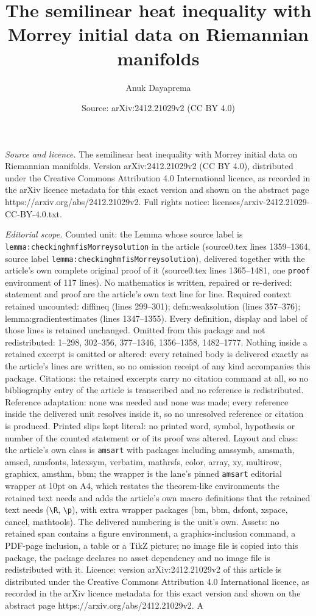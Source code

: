 \documentclass[10pt,a4paper]{amsart}
\title[The semilinear heat inequality with Morrey initial data on R]{The semilinear heat inequality with Morrey initial data on Riemannian manifolds}
\author{Anuk Dayaprema}
\date{Source: arXiv:2412.21029v2 (CC BY 4.0)}
\begin{document}
\maketitle

\noindent\emph{Source and licence.} The semilinear heat inequality with Morrey initial data on Riemannian manifolds. Version arXiv:2412.21029v2 (CC BY 4.0), distributed under the Creative Commons Attribution 4.0 International licence, as recorded in the arXiv licence metadata for this exact version and shown on the abstract page https://arxiv.org/abs/2412.21029v2. Full rights notice: licenses/arxiv-2412.21029-CC-BY-4.0.txt.\par\smallskip

\noindent\textit{Editorial scope.} Counted unit: the Lemma whose source label is \texttt{lemma:checkinghmfisMorreysolution} in the article (source0.tex lines 1359--1364, source label \texttt{lemma:checkinghmfisMorreysolution}), delivered together with the article's own complete original proof of it (source0.tex lines 1365--1481, one \texttt{proof} environment of 117 lines). No mathematics is written, repaired or re-derived: statement and proof are the article's own text line for line. Required context retained uncounted: diffineq (lines 299--301); defn:weaksolution (lines 357--376); lemma:gradientestimates (lines 1347--1355). Every definition, display and label of those lines is retained unchanged. Omitted from this package and not redistributed: 1--298, 302--356, 377--1346, 1356--1358, 1482--1777. Nothing inside a retained excerpt is omitted or altered: every retained body is delivered exactly as the article's lines are written, so no omission receipt of any kind accompanies this package. Citations: the retained excerpts carry no citation command at all, so no bibliography entry of the article is transcribed and no reference is redistributed. Reference adaptation: none was needed and none was made; every reference inside the delivered unit resolves inside it, so no unresolved reference or citation is produced. Printed slips kept literal: no printed word, symbol, hypothesis or number of the counted statement or of its proof was altered. Layout and class: the article's own class is \texttt{amsart} with packages including amssymb, amsmath, amscd, amsfonts, latexsym, verbatim, mathrsfs, color, array, xy, multirow, graphicx, amsthm, bbm; the wrapper is the lane's pinned \texttt{amsart} editorial wrapper at 10pt on A4, which restates the theorem-like environments the retained text needs and adds the article's own macro definitions that the retained text needs (\texttt{\textbackslash R}, \texttt{\textbackslash p}), with extra wrapper packages (bm, bbm, dsfont, xspace, cancel, mathtools). The delivered numbering is the unit's own. Assets: no retained span contains a figure environment, a graphics-inclusion command, a PDF-page inclusion, a table or a TikZ picture; no image file is copied into this package, the package declares no asset dependency and no image file is redistributed with it. Licence: version arXiv:2412.21029v2 of this article is distributed under the Creative Commons Attribution 4.0 International licence, as recorded in the arXiv licence metadata for this exact version and shown on the abstract page https://arxiv.org/abs/2412.21029v2. A 
\end{document}
